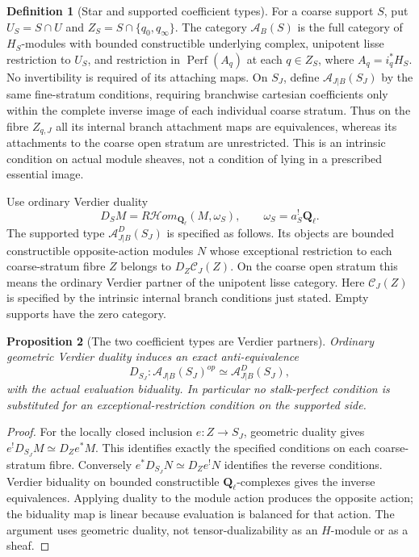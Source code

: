 \documentclass[11pt]{article}
\newtheorem{proposition}{Proposition}[section]
\theoremstyle{definition}
\newtheorem{definition}[proposition]{Definition}
\theoremstyle{remark}
\newcommand{\Q}{\mathbf Q_\ell}
\newcommand{\Perf}{\operatorname{Perf}}
\begin{document}
\begin{definition}[Star and supported coefficient types]
\label{def:coefficient-types}
For a coarse support $S$, put $U_S=S\cap U$ and
$Z_S=S\cap\{q_0,q_\infty\}$.  The category $\mathcal A_B(S)$ is the
full category of $H_S$-modules with bounded constructible underlying
complex, unipotent lisse restriction to $U_S$, and restriction in
$\Perf(A_q)$ at each $q\in Z_S$, where $A_q=i_q^*H_S$.
No invertibility is required of its attaching maps.
On $S_J$, define $\mathcal A_{J|B}(S_J)$ by the same fine-stratum
conditions, requiring branchwise cartesian coefficients only within
the complete inverse image of each individual coarse stratum.
Thus on the fibre $Z_{q,J}$ all its internal branch attachment maps
are equivalences, whereas its attachments to the coarse open stratum
are unrestricted.  This is an intrinsic condition on actual module
sheaves, not a condition of lying in a prescribed essential image.

Use ordinary Verdier duality
\[
 D_SM=R\mathcal Hom_{\Q}(M,\omega_S),\qquad
 \omega_S=a_S^!\Q.
\]
The supported type $\mathcal A^D_{J|B}(S_J)$ is specified as follows.
Its objects are bounded constructible opposite-action modules $N$
whose exceptional restriction to each coarse-stratum fibre $Z$
belongs to $D_Z\mathcal C_J(Z)$.  On the coarse open stratum this
means the ordinary Verdier partner of the unipotent lisse category.
Here $\mathcal C_J(Z)$ is specified by the intrinsic internal branch
conditions just stated.  Empty supports have the zero category.
\end{definition}

\begin{proposition}[The two coefficient types are Verdier partners]
\label{prop:coefficient-duality}
Ordinary geometric Verdier duality induces an exact anti-equivalence
\[
 D_{S_J}:\mathcal A_{J|B}(S_J)^{op}
               \simeq\mathcal A^D_{J|B}(S_J),
\]
with the actual evaluation biduality.  In particular no stalk-perfect
condition is substituted for an exceptional-restriction condition on
the supported side.
\end{proposition}
\begin{proof}
For the locally closed inclusion $e:Z\to S_J$, geometric duality gives
$e^!D_{S_J}M\simeq D_Ze^*M$.  This identifies exactly the specified
conditions on each coarse-stratum fibre.  Conversely
$e^*D_{S_J}N\simeq D_Ze^!N$ identifies the reverse conditions.
Verdier biduality on bounded constructible $\Q$-complexes gives the
inverse equivalences.  Applying duality to the module action produces
the opposite action; the biduality map is linear because evaluation
is balanced for that action.  The argument uses geometric duality,
not tensor-dualizability as an $H$-module or as a sheaf.
\end{proof}
\end{document}
